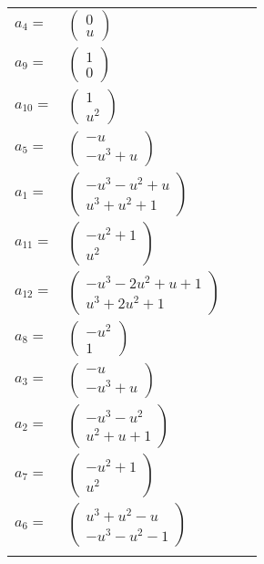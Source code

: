 \documentclass[1p]{elsarticle_modified}
\theoremstyle{definition}
\begin{document}
\begin{tabular}{m{7pt} m{180pt} m{7pt} m{180pt} }
\flushright $a_{4}=$&$\begin{pmatrix}0\\u\end{pmatrix}$ \\
\flushright $a_{9}=$&$\begin{pmatrix}1\\0\end{pmatrix}$ \\
\flushright $a_{10}=$&$\begin{pmatrix}1\\u^2\end{pmatrix}$ \\
\flushright $a_{5}=$&$\begin{pmatrix}- u\\- u^3+u\end{pmatrix}$ \\
\flushright $a_{1}=$&$\begin{pmatrix}- u^3- u^2+u\\u^3+u^2+1\end{pmatrix}$ \\
\flushright $a_{11}=$&$\begin{pmatrix}- u^2+1\\u^2\end{pmatrix}$ \\
\flushright $a_{12}=$&$\begin{pmatrix}- u^3-2 u^2+u+1\\u^3+2 u^2+1\end{pmatrix}$ \\
\flushright $a_{8}=$&$\begin{pmatrix}- u^2\\1\end{pmatrix}$ \\
\flushright $a_{3}=$&$\begin{pmatrix}- u\\- u^3+u\end{pmatrix}$ \\
\flushright $a_{2}=$&$\begin{pmatrix}- u^3- u^2\\u^2+u+1\end{pmatrix}$ \\
\flushright $a_{7}=$&$\begin{pmatrix}- u^2+1\\u^2\end{pmatrix}$ \\
\flushright $a_{6}=$&$\begin{pmatrix}u^3+u^2- u\\- u^3- u^2-1\end{pmatrix}$\\&\end{tabular}
\end{document}
